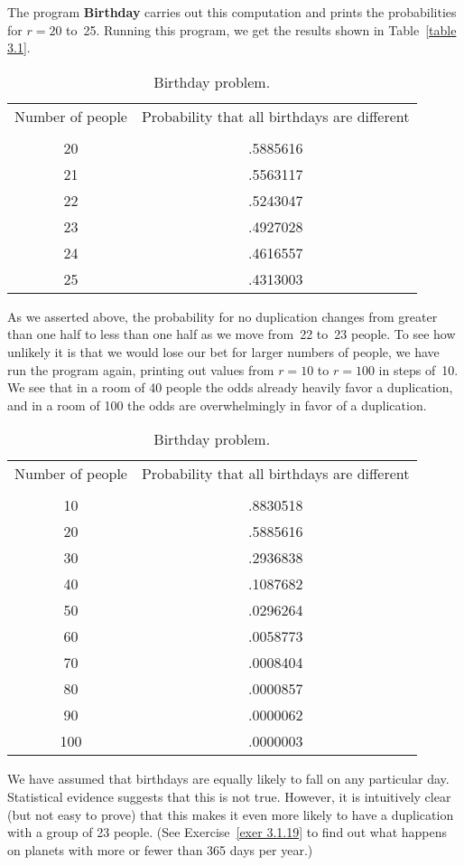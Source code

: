 \begin{example}
The program {\bf Birthday} carries out this computation and prints the
probabilities for $r = 20$ to~25.  Running this program, we get the results shown in Table~\ref{table
3.1}.
\begin{table}
\centering
\begin{tabular}{cc} Number of people     & Probability that all birthdays are
different \\ 
\\
20 & .5885616 \\ 21 & .5563117 \\ 22 & .5243047 \\ 23 & .4927028 \\
24 & .4616557 \\ 25 & .4313003 \\ 
\end{tabular}
\caption{Birthday problem.}
\label{table 3.1}
\end{table}
As we asserted above, the probability for no duplication changes from
greater than one half to less than one half as we move from~22 to~23 people.  To see
how unlikely it is that we would lose our bet for larger numbers of people, we have
run the program again, printing out values from $r = 10$ to $r = 100$ in steps of~10. 
We see that in a room of 40 people the odds already heavily favor a duplication, and
in a room of 100 the odds are overwhelmingly in favor of a duplication.
\begin{table}
\centering
\begin{tabular}{cc} Number of people     & Probability that all birthdays are
different \\ 
\\
10 & .8830518 \\ 20 & .5885616 \\ 30 & .2936838 \\ 40 & .1087682 \\
50 & .0296264 \\ 60 & .0058773 \\ 70 & .0008404 \\ 80 & .0000857 \\ 90 & .0000062 \\
100 & .0000003 \\ 
\end{tabular}
\caption{Birthday problem.}
\label{table 3.2}
\end{table}
We have assumed that birthdays are equally likely to fall on any particular
day.  Statistical evidence suggests that this is not true.  However, it is intuitively
clear (but not easy to prove) that this makes it even more likely to have a
duplication with a group of 23 people.  (See Exercise~\ref{exer 3.1.19} to find out
what happens on planets with more or fewer than 365 days per year.)
\end{example}

